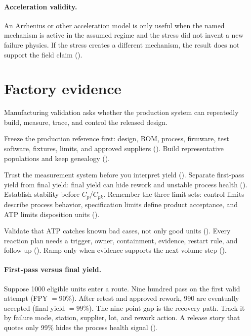 \paragraph{Acceleration validity.}
An Arrhenius or other acceleration model is only useful when the named
mechanism is active in the assumed regime and the stress did not invent a new
failure physics. If the stress creates a different mechanism, the result does
not support the field claim ().

\section{Factory evidence}
\label{sec:productization-manufacturing}

Manufacturing validation asks whether the production system can repeatedly
build, measure, trace, and control the released design.

Freeze the production reference first: design, BOM, process, firmware, test
software, fixtures, limits, and approved suppliers
(). Build representative populations and keep
genealogy ().

Trust the measurement system before you interpret yield
(). Separate first-pass yield from final yield: final yield
can hide rework and unstable process health
(). Establish stability
before $C_p$/$C_{pk}$. Remember the three limit sets: control limits describe
process behavior, specification limits define product acceptance, and ATP
limits disposition units ().

Validate that ATP catches known bad cases, not only good units
(). Every reaction plan needs a trigger, owner, containment,
evidence, restart rule, and follow-up (). Ramp only
when evidence supports the next volume step
().

\paragraph{First-pass versus final yield.}
Suppose 1000 eligible units enter a route. Nine hundred pass on the first valid
attempt (FPY $=90\%$). After retest and approved rework, 990 are eventually
accepted (final yield $=99\%$). The nine-point gap is the recovery path. Track
it by failure mode, station, supplier, lot, and rework action. A release story
that quotes only 99\% hides the process health signal
().

